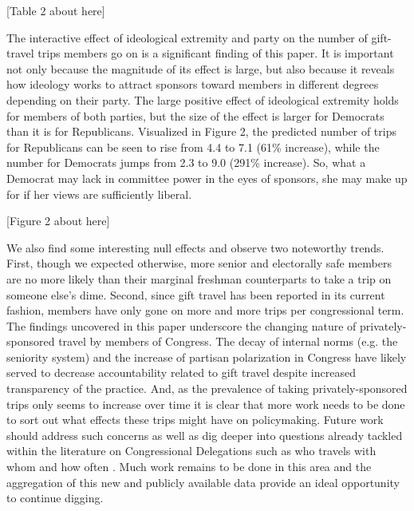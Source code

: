 \documentclass[12pt]{article}                           %
\begin{document}
[Table 2 about here]

The interactive effect of ideological extremity and party on the number of gift-travel trips members go on is a significant finding of this paper. It is important not only because the magnitude of its effect is large, but also because it reveals how ideology works to attract sponsors toward members in different degrees depending on their party. The large positive effect of ideological extremity holds for members of both parties, but the size of the effect is larger for Democrats than it is for Republicans. Visualized in Figure 2, the predicted number of trips for Republicans can be seen to rise from 4.4 to 7.1 (61\% increase), while the number for Democrats jumps from 2.3 to 9.0 (291\% increase). So, what a Democrat may lack in committee power in the eyes of sponsors, she may make up for if her views are sufficiently liberal.

[Figure 2 about here]

We also find some interesting null effects and observe two noteworthy trends. First, though we expected otherwise, more senior and electorally safe members are no more likely than their marginal freshman counterparts to take a trip on someone else's dime. Second, since gift travel has been reported in its current fashion, members have only gone on more and more trips per congressional term. The findings uncovered in this paper underscore the changing nature of privately-sponsored travel by members of Congress. The decay of internal norms (e.g. the seniority system) and the increase of partisan polarization in Congress have likely served to decrease accountability related to gift travel despite increased transparency of the practice. And, as the prevalence of taking privately-sponsored trips only seems to increase over time it is clear that more work needs to be done to sort out what effects these trips might have on policymaking. Future work should address such concerns as well as dig deeper into questions already tackled within the literature on Congressional Delegations such as who travels with whom and how often \citep{Alduncin2014,Alduncin2017}. Much work remains to be done in this area and the aggregation of this new and publicly available data provide an ideal opportunity to continue digging.

\newpage
\theendnotes
\end{document}
